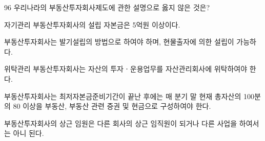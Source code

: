 \begin{question}{96}
우리나라의 부동산투자회사제도에 관한 설명으로 옳지 않은 것은?
\begin{choices}
  \item 자기관리 부동산투자회사의 설립 자본금은 5억원 이상이다.
  \item 부동산투자회사는 발기설립의 방법으로 하여야 하며, 현물출자에 의한 설립이 가능하다.
  \item 위탁관리 부동산투자회사는 자산의 투자ㆍ운용업무를 자산관리회사에 위탁하여야 한다.
  \item 부동산투자회사는 최저자본금준비기간이 끝난 후에는 매 분기 말 현재 총자산의 100분의 80 이상을 부동산, 부동산 관련 증권 및 현금으로 구성하여야 한다.
  \item 부동산투자회사의 상근 임원은 다른 회사의 상근 임직원이 되거나 다른 사업을 하여서는 아니 된다.
\end{choices}
\end{question}
